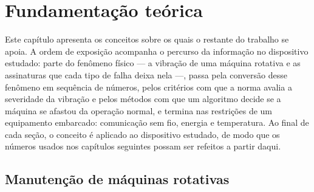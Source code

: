 
\makeatletter
{}
\makeatother

\chapter{Fundamentação teórica}
\label{cap:fundamentacao}

Este capítulo apresenta os conceitos sobre os quais o restante do trabalho se apoia. A
ordem de exposição acompanha o percurso da informação no dispositivo estudado: parte do
fenômeno físico --- a vibração de uma máquina rotativa e as assinaturas que cada tipo de
falha deixa nela ---, passa pela conversão desse fenômeno em sequência de números, pelos
critérios com que a norma avalia a severidade da vibração e pelos métodos com que um
algoritmo decide se a máquina se afastou da operação normal, e termina nas restrições de
um equipamento embarcado: comunicação sem fio, energia e temperatura. Ao final de cada
seção, o conceito é aplicado ao dispositivo estudado, de modo que os números usados nos
capítulos seguintes possam ser refeitos a partir daqui.

\section{Manutenção de máquinas rotativas}
\label{sec:fund-manutencao}

